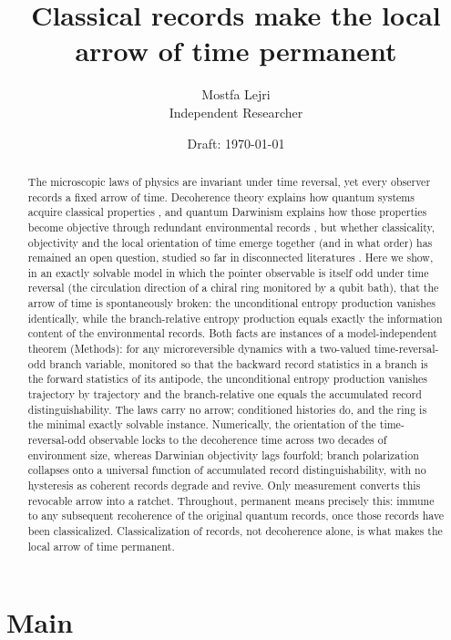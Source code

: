 \documentclass[11pt]{article}
\title{\bfseries Classical records make the local arrow of time permanent}
\author{Mostfa Lejri\\[2pt]
\small Independent Researcher}
\date{\small Draft: \today}
\begin{document}
\maketitle

\begin{abstract}
\noindent
The microscopic laws of physics are invariant under time reversal, yet every observer records a fixed arrow of time. Decoherence theory explains how quantum systems acquire classical properties \cite{Zeh2007,Joos2003,Zurek2003}, and quantum Darwinism explains how those properties become objective through redundant environmental records \cite{Zurek2009,Riedel2012,Zurek2022}, but whether classicality, objectivity and the local orientation of time emerge together (and in what order) has remained an open question, studied so far in disconnected literatures \cite{Mlodinow2014,Chen2024,Guff2025,Aharonov2000}. Here we show, in an exactly solvable model in which the pointer observable is itself odd under time reversal (the circulation direction of a chiral ring monitored by a qubit bath), that the arrow of time is spontaneously broken: the unconditional entropy production vanishes identically, while the branch-relative entropy production equals exactly the information content of the environmental records. Both facts are instances of a model-independent theorem (Methods): for any microreversible dynamics with a two-valued time-reversal-odd branch variable, monitored so that the backward record statistics in a branch is the forward statistics of its antipode, the unconditional entropy production vanishes trajectory by trajectory and the branch-relative one equals the accumulated record distinguishability. The laws carry no arrow; conditioned histories do, and the ring is the minimal exactly solvable instance. Numerically, the orientation of the time-reversal-odd observable locks to the decoherence time across two decades of environment size, whereas Darwinian objectivity lags fourfold; branch polarization collapses onto a universal function of accumulated record distinguishability, with no hysteresis as coherent records degrade and revive. Only measurement converts this revocable arrow into a ratchet. Throughout, permanent means precisely this: immune to any subsequent recoherence of the original quantum records, once those records have been classicalized. Classicalization of records, not decoherence alone, is what makes the local arrow of time permanent.
\end{abstract}

\section*{Main}
\end{document}
